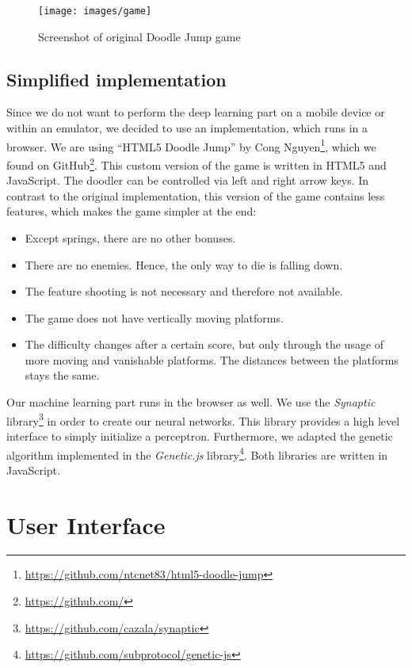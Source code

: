 \documentclass[a4paper,12pt,pagesize,headsepline,bibtotoc,titlepage,abstracton]{scrartcl}
\newcommand{\quot}[1]{{``#1''}}
\begin{document}
\begin{figure}[h]
\begin{center}
\texttt{[image: images/game]}\\
\caption{Screenshot of original Doodle Jump game}
\label{abb:doodlejumpgame}
\end{center}
\end{figure}

\subsection{Simplified implementation}
\label{sec:si}

Since we do not want to perform the deep learning part on a mobile device or within an emulator, we decided to use an implementation, which runs in a browser. We are using \quot{HTML5 Doodle Jump} by Cong Nguyen\footnote{\url{https://github.com/ntcnet83/html5-doodle-jump}}, which we found on GitHub\footnote{\url{https://github.com/}}. This custom version of the game is written in HTML5 and JavaScript. The doodler can be controlled via left and right arrow keys. In contrast to the original implementation, this version of the game contains less features, which makes the game simpler at the end:
\begin{itemize}
\item Except springs, there are no other bonuses.
\item There are no enemies. Hence, the only way to die is falling down.
\item The feature shooting is not necessary and therefore not available.
\item The game does not have vertically moving platforms.
\item The difficulty changes after a certain score, but only through the usage of more moving and vanishable platforms. The distances between the platforms stays the same.
\end{itemize}

Our machine learning part runs in the browser as well. We use the \textit{Synaptic} library\footnote{\url{https://github.com/cazala/synaptic}} in order to create our neural networks. This library provides a high level interface to simply initialize a perceptron. Furthermore, we adapted the genetic algorithm implemented in the \textit{Genetic.js} library\footnote{\url{https://github.com/subprotocol/genetic-js}}. Both libraries are written in JavaScript.


\section{User Interface}
\end{document}
